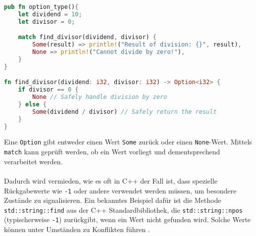 \begin{lstlisting}[language=Rust, caption=Option Typ, label=list:channel]
pub fn option_type(){
    let dividend = 10;
    let divisor = 0;

    match find_divisor(dividend, divisor) {
        Some(result) => println!("Result of division: {}", result),
        None => println!("Cannot divide by zero!"),
    }
}

fn find_divisor(dividend: i32, divisor: i32) -> Option<i32> {
    if divisor == 0 {
        None // Safely handle division by zero
    } else {
        Some(dividend / divisor) // Safely return the result
    }
}
\end{lstlisting}
\noindent
Eine \texttt{Option} gibt entweder einen Wert \texttt{Some} zurück oder einen \texttt{None}-Wert. Mittels \texttt{match} kann geprüft werden, ob ein Wert vorliegt und dementsprechend verarbeitet werden.\\
\\
Dadurch wird vermieden, wie es oft in C++ der Fall ist, dass spezielle Rückgabewerte wie \texttt{-1} oder andere verwendet werden müssen, um besondere Zustände zu signalisieren. 
Ein bekanntes Beispiel dafür ist die Methode \texttt{std::string::find} aus der C++ Standardbibliothek, die \texttt{std::string::npos} (typischerweise \texttt{-1}) zurückgibt, wenn ein Wert nicht gefunden wird. 
Solche Werte können unter Umständen zu Konflikten führen \cite{cppreference_string_find} \cite{cppreference_string_npos}. 
